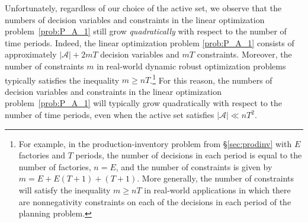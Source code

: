 \documentclass[nonblindrev,mnsc]{informs3} %
\begin{document}
Unfortunately, regardless of our choice of the active set, we observe that the numbers of decision variables and constraints in the linear optimization problem~\eqref{prob:P_A_1} still grow \emph{quadratically} with respect to the number of time periods. Indeed, the linear optimization problem \eqref{prob:P_A_1} consists of approximately $| \mathcal{A}| + 2mT$ decision variables and $mT$ constraints. Moreover, the number of constraints $m$ in real-world dynamic robust optimization problems typically satisfies the inequality $m \ge nT$.\footnote{For example, in the production-inventory problem from  \S\ref{sec:prodinv} with $E$ factories and $T$ periods, the number of decisions in each period is equal to the number of factories,  $n = E$, and the number of constraints is given by $m = E + E(T+1) + (T+1)$. More generally, the number of constraints will satisfy the inequality $m \ge nT$ in real-world applications in which there are nonnegativity constraints on each of the decisions in each period of the planning problem.}  
For this reason, the numbers of decision variables and constraints in the linear optimization problem~\eqref{prob:P_A_1} will typically grow quadratically with respect to the number of time periods, even when the active set satisfies $| \mathcal{A}| \ll n T^2$.  
\end{document}
